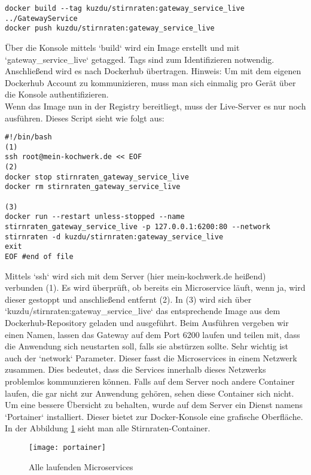 \begin{verbatim}
docker build --tag kuzdu/stirnraten:gateway_service_live ../GatewayService
docker push kuzdu/stirnraten:gateway_service_live
\end{verbatim}

Über die Konsole mittels `build` wird ein Image erstellt und mit `gateway\_service\_live` getagged. Tags sind zum Identifizieren notwendig. Anschließend wird es nach Dockerhub übertragen. Hinweis: Um mit dem eigenen Dockerhub Account zu kommunizieren, muss man sich einmalig pro Gerät über die Konsole authentifizieren. \\

Wenn das Image nun in der Registry bereitliegt, muss der Live-Server es nur noch ausführen. Dieses Script sieht wie folgt aus:

\begin{verbatim}
#!/bin/bash
(1)
ssh root@mein-kochwerk.de << EOF 
(2)
docker stop stirnraten_gateway_service_live
docker rm stirnraten_gateway_service_live

(3)
docker run --restart unless-stopped --name stirnraten_gateway_service_live -p 127.0.0.1:6200:80 --network stirnraten -d kuzdu/stirnraten:gateway_service_live
exit
EOF #end of file
\end{verbatim}
Mittels `ssh` wird sich mit dem Server (hier mein-kochwerk.de heißend) verbunden (1). Es wird überprüft, ob bereits ein Microservice läuft, wenn ja, wird dieser gestoppt und anschließend entfernt (2). In (3) wird sich über `kuzdu/stirnraten:gateway\_service\_live` das entsprechende Image aus dem Dockerhub-Repository geladen und ausgeführt. Beim Ausführen vergeben wir einen Namen, lassen das Gateway auf dem Port 6200 laufen und teilen mit, dass die Anwendung sich neustarten soll, falls sie abstürzen sollte. Sehr wichtig ist auch der `network` Parameter. Dieser fasst die Microservices in einem Netzwerk zusammen. Dies bedeutet, dass die Services innerhalb dieses Netzwerks problemlos kommunzieren können. Falls auf dem Server noch andere Container laufen, die gar nicht zur Anwendung gehören, sehen diese Container sich nicht.\\

Um eine bessere Übersicht zu behalten, wurde auf dem Server ein Dienst namens `Portainer` installiert. Dieser bietet zur Docker-Konsole eine grafische Oberfläche. In der Abbildung \ref{fig:portainer} sieht man alle Stirnraten-Container. 

\begin{figure}
	\centering
	\texttt{[image: portainer]}
	\caption[Alle laufenden Microservices] {Alle laufenden Microservices}
	\label{fig:portainer}
\end{figure} 
\pagebreak




